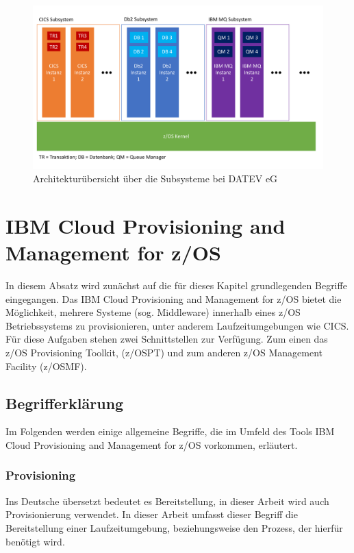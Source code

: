 \begin{figure}[h]
\centering
\includegraphics[width=\textwidth]{figures/architektur.pdf}
\caption{Architekturübersicht über die Subsysteme bei DATEV eG}
\label{fig:archüber}
\end{figure}

\section{IBM Cloud Provisioning and Management for z/OS}\label{sec:zosmf}
In diesem Absatz wird zunächst auf die für dieses Kapitel grundlegenden Begriffe eingegangen.
Das IBM Cloud Provisioning and Management for z/OS bietet die Möglichkeit, mehrere Systeme (sog. Middleware) innerhalb eines z/OS Betriebssystems zu provisionieren, unter anderem Laufzeitumgebungen wie CICS. 
Für diese Aufgaben stehen zwei Schnittstellen zur Verfügung.
Zum einen das z/OS Provisioning Toolkit, (z/OSPT) und zum anderen z/OS Management Facility (z/OSMF).
\cite{KeithWinnardGaryPuchkoffHirenShah.2016}

\subsection{Begrifferklärung}
Im Folgenden werden einige allgemeine Begriffe, die im Umfeld des Tools \glqq IBM Cloud Provisioning and Management for z/OS\grqq{} vorkommen, erläutert.

\subsubsection{Provisioning}
Ins Deutsche übersetzt bedeutet es Bereitstellung, in dieser Arbeit wird auch Provisionierung verwendet.
In dieser Arbeit umfasst dieser Begriff die Bereitstellung einer Laufzeitumgebung, beziehungsweise den Prozess, der hierfür benötigt wird.


